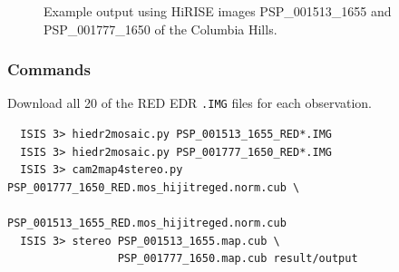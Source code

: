 \begin{figure}[h!]
\centering
  \hfil
\caption{Example output using HiRISE images PSP\_001513\_1655 and
  PSP\_001777\_1650 of the Columbia Hills.}
\label{fig:hirise_chills_example}
\end{figure}

\subsubsection*{Commands}

Download all 20 of the RED EDR \texttt{.IMG} files for each observation.
\begin{verbatim}
  ISIS 3> hiedr2mosaic.py PSP_001513_1655_RED*.IMG
  ISIS 3> hiedr2mosaic.py PSP_001777_1650_RED*.IMG
  ISIS 3> cam2map4stereo.py PSP_001777_1650_RED.mos_hijitreged.norm.cub \
                            PSP_001513_1655_RED.mos_hijitreged.norm.cub
  ISIS 3> stereo PSP_001513_1655.map.cub \
                 PSP_001777_1650.map.cub result/output
\end{verbatim}

